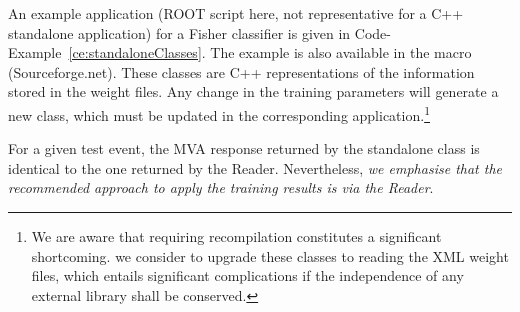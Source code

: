 An example application (ROOT script here, not representative
for a C++ standalone application) for a Fisher classifier is given in 
Code-Example~\ref{ce:standaloneClasses}. The example is also available in the macro
 (Sourceforge.net). These classes are C++ 
representations of the information stored in the weight files. Any change in the 
training parameters will generate a new class, which must be updated in the 
corresponding application.\footnote
{
   We are aware that requiring recompilation constitutes a significant shortcoming.
   we consider to upgrade these classes to reading the XML weight files, which
   entails significant complications if the independence of any external 
   library shall be conserved. 
} 

For a given test event, the MVA response returned by the standalone class 
is identical to the one returned by the Reader. Nevertheless, {\em we emphasise that 
the recommended approach to apply the training results is via the Reader}. 
\clearpage
